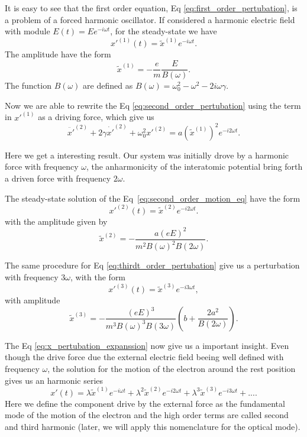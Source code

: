 It is easy to see that the first order equation, Eq \ref{eq:first_order_pertubation}, is a problem of a forced harmonic oscillator. If considered a harmonic electric field with module $E(t) = Ee^{-i\omega t}$, for the steady-state we have
\begin{equation}
    x'^{(1)}(t) = \tilde{x}^{(1)}e^{-i\omega t}.
\end{equation}
The amplitude have the form
\begin{equation}
    \tilde{x}^{(1)} = -\frac{e}{m}\frac{E}{B(\omega)}.
\end{equation}
The function $B(\omega)$ are defined as $B(\omega) = \omega_0^2-\omega^2-2i\omega\gamma$.

Now we are able to rewrite the Eq \ref{eq:second_order_pertubation} using the term in $x'^{(1)}$ as a driving force, which give us
\begin{equation}
    \ddot{x'}^{(2)} + 2\gamma\dot{x'}^{(2)} + \omega_0^2x'^{(2)} = a\left(\tilde{x}^{(1)}\right)^2e^{-i2\omega t}.
    \label{eq:second_order_motion_eq}
\end{equation}

Here we get a interesting result. Our system was initially drove by a harmonic force with frequency $\omega$, the anharmonicity of the interatomic potential bring forth a driven force with frequency $2\omega$. 

The steady-state solution of the Eq~\ref{eq:second_order_motion_eq} have the form
\begin{equation}
    x'^{(2)}(t) = \tilde{x}^{(2)}e^{-i2\omega t}.
\end{equation}
with the amplitude given by
\begin{equation}
    \tilde{x}^{(2)} = -\frac{a\left(eE\right)^2}{m^2B(\omega)^2B(2\omega)}.
\end{equation}

The same procedure for Eq \ref{eq:thirdt_order_pertubation} give us a perturbation with frequency $3\omega$, with the form 
\begin{equation}
    x'^{(3)}(t) = \tilde{x}^{(3)}e^{-i3\omega t},
\end{equation}
with amplitude
\begin{equation}
    \tilde{x}^{(3)} = -\frac{\left(eE\right)^3}{m^3B(\omega)^3B(3\omega)}\left(b+\frac{2a ^2}{B(2\omega)}\right).
\end{equation}

The Eq \ref{eq:x_pertubation_expanssion} now give us a important insight. Even though the drive force due the external electric field beeing well defined with frequency $\omega$, the solution for the motion of the electron around the rest position gives us an harmonic series
\begin{equation}
    x'(t) = \lambda \tilde{x}^{(1)}e^{-i\omega t} + \lambda^2 \tilde{x}^{(2)}e^{-i2\omega t} + \lambda^3 \tilde{x}^{(3)}e^{-i3\omega t} +....
\end{equation}
Here we define the component drive by the external force as the fundamental mode of the motion of the electron and the high order terms are called second and third harmonic (later, we will apply this nomenclature for the optical mode).%

